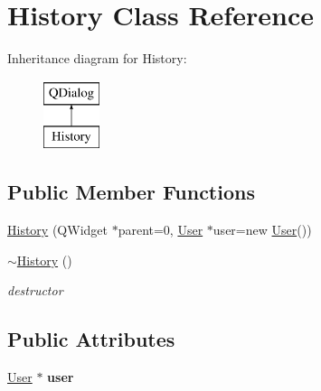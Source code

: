 \hypertarget{classHistory}{\section{History Class Reference}
\label{classHistory}
}
Inheritance diagram for History\-:\begin{figure}[H]
\begin{center}
\leavevmode
\includegraphics[height=2.000000cm]{classHistory}
\end{center}
\end{figure}
\subsection*{Public Member Functions}
\begin{DoxyCompactItemize}
\item 
\hyperlink{classHistory_af76054894d51c52a7e83fc33b5b879d3}{History} (Q\-Widget $\ast$parent=0, \hyperlink{classUser}{User} $\ast$user=new \hyperlink{classUser}{User}())
\item 
\hypertarget{classHistory_a5b00b64a1ddee04e60d5a3b517fd6d4c}{\hyperlink{classHistory_a5b00b64a1ddee04e60d5a3b517fd6d4c}{$\sim$\-History} ()}\label{classHistory_a5b00b64a1ddee04e60d5a3b517fd6d4c}

\begin{DoxyCompactList}\small\item\em destructor \end{DoxyCompactList}\end{DoxyCompactItemize}
\subsection*{Public Attributes}
\begin{DoxyCompactItemize}
\item 
\hypertarget{classHistory_afbec85a76b71689e5af9422b7be7e613}{\hyperlink{classUser}{User} $\ast$ {\bfseries user}}\label{classHistory_afbec85a76b71689e5af9422b7be7e613}

\end{DoxyCompactItemize}


